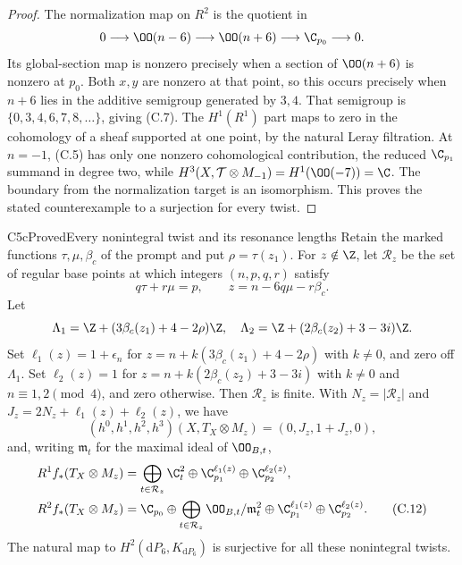 \begin{proof}
The normalization map on $R^2$ is the quotient in
\[
0\longrightarrow\OO(n-6)\longrightarrow\OO(n+6)
 \longrightarrow\C_{p_0}\longrightarrow0.
\]
Its global-section map is nonzero precisely when a section of $\OO(n+6)$ is nonzero at $p_0$. Both $x,y$ are nonzero at that point, so this occurs precisely when $n+6$ lies in the additive semigroup generated by $3,4$. That semigroup is $\{0,3,4,6,7,8,\ldots\}$, giving (C.7). The $H^1(R^1)$ part maps to zero in the cohomology of a sheaf supported at one point, by the natural Leray filtration. At $n=-1$, (C.5) has only one nonzero cohomological contribution, the reduced $\C_{p_1}$ summand in degree two, while $H^3(X,\mathcal T\otimes M_{-1})=H^1(\OO(-7))=\C$. The boundary from the normalization target is an isomorphism. This proves the stated counterexample to a surjection for every twist.
\end{proof}

\begin{statement}{C5c}{Proved}{Every nonintegral twist and its resonance lengths}
Retain the marked functions $\tau,\mu,\beta_c$ of the prompt and put $\rho=\tau(z_1)$. For $z\notin\Z$, let $\mathcal R_z$ be the set of regular base points at which integers $(n,p,q,r)$ satisfy
\[
 q\tau+r\mu=p,\qquad z=n-6q\mu-r\beta_c.               \tag{C.10}
\]
Let
\[
 \Lambda_1=\Z+(3\beta_c(z_1)+4-2\rho)\Z,\quad
 \Lambda_2=\Z+(2\beta_c(z_2)+3-3i)\Z.
\]
Set $\ell_1(z)=1+\epsilon_n$ for $z=n+k(3\beta_c(z_1)+4-2\rho)$ with $k\ne0$, and zero off $\Lambda_1$. Set $\ell_2(z)=1$ for $z=n+k(2\beta_c(z_2)+3-3i)$ with $k\ne0$ and $n\equiv1,2\pmod4$, and zero otherwise. Then $\mathcal R_z$ is finite. With $N_z=|\mathcal R_z|$ and $J_z=2N_z+\ell_1(z)+\ell_2(z)$, we have
\[
 (h^0,h^1,h^2,h^3)(X,T_X\otimes M_z)=(0,J_z,1+J_z,0),  \tag{C.11}
\]
and, writing $\mathfrak m_t$ for the maximal ideal of $\OO_{B,t}$,
\begin{align*}
R^1f_*(T_X\otimes M_z)&=
 \bigoplus_{t\in\mathcal R_z}\C_t^2
 \oplus\C_{p_1}^{\ell_1(z)}\oplus\C_{p_2}^{\ell_2(z)},\\
R^2f_*(T_X\otimes M_z)&=
 \C_{p_0}\oplus\bigoplus_{t\in\mathcal R_z}\OO_{B,t}/\mathfrak m_t^2
 \oplus\C_{p_1}^{\ell_1(z)}\oplus\C_{p_2}^{\ell_2(z)}.\tag{C.12}
\end{align*}
The natural map to $H^2(\mathrm dP_6,K_{\mathrm dP_6})$ is surjective for all these nonintegral twists.
\end{statement}

